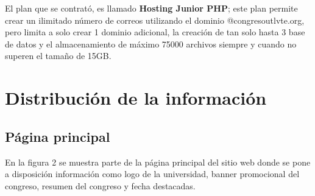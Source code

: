 \documentclass[a4paper,14px]{article}
\begin{document}
El plan que se contrató, es llamado \textbf{Hosting Junior PHP}; este plan permite crear un ilimitado número de correos utilizando el dominio @congresoutlvte.org, pero limita a solo crear 1 dominio adicional, la creación de tan solo hasta  3 base de datos y el almacenamiento de máximo 75000 archivos siempre y cuando no superen el tamaño de 15GB.  





\newpage
\section{Distribución de la información}



\subsection{Página principal}
\label{sec:pagina-principal}

En la figura 2 se muestra parte de la página principal del sitio web donde se pone a disposición información como logo de la universidad, banner promocional del congreso, resumen del congreso y fecha destacadas.
\end{document}
